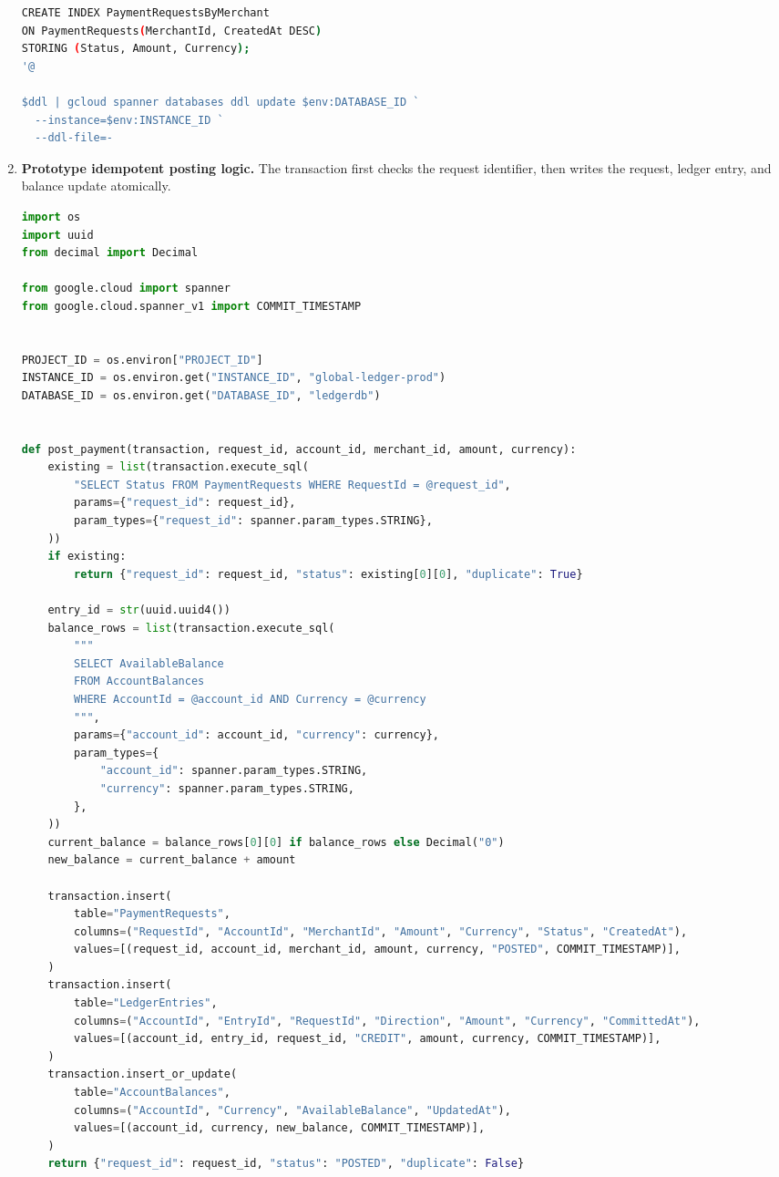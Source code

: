 \begin{enumerate}
\begin{lstlisting}[language=bash,caption={Capstone Spanner payment-ledger database and schema creation.}]
CREATE INDEX PaymentRequestsByMerchant
ON PaymentRequests(MerchantId, CreatedAt DESC)
STORING (Status, Amount, Currency);
'@

$ddl | gcloud spanner databases ddl update $env:DATABASE_ID `
  --instance=$env:INSTANCE_ID `
  --ddl-file=-
\end{lstlisting}

    \item \textbf{Prototype idempotent posting logic.} The transaction first checks the request identifier, then writes the request, ledger entry, and balance update atomically.

\begin{lstlisting}[language=Python,caption={Idempotent payment posting with a Spanner read-write transaction.}]
import os
import uuid
from decimal import Decimal

from google.cloud import spanner
from google.cloud.spanner_v1 import COMMIT_TIMESTAMP


PROJECT_ID = os.environ["PROJECT_ID"]
INSTANCE_ID = os.environ.get("INSTANCE_ID", "global-ledger-prod")
DATABASE_ID = os.environ.get("DATABASE_ID", "ledgerdb")


def post_payment(transaction, request_id, account_id, merchant_id, amount, currency):
    existing = list(transaction.execute_sql(
        "SELECT Status FROM PaymentRequests WHERE RequestId = @request_id",
        params={"request_id": request_id},
        param_types={"request_id": spanner.param_types.STRING},
    ))
    if existing:
        return {"request_id": request_id, "status": existing[0][0], "duplicate": True}

    entry_id = str(uuid.uuid4())
    balance_rows = list(transaction.execute_sql(
        """
        SELECT AvailableBalance
        FROM AccountBalances
        WHERE AccountId = @account_id AND Currency = @currency
        """,
        params={"account_id": account_id, "currency": currency},
        param_types={
            "account_id": spanner.param_types.STRING,
            "currency": spanner.param_types.STRING,
        },
    ))
    current_balance = balance_rows[0][0] if balance_rows else Decimal("0")
    new_balance = current_balance + amount

    transaction.insert(
        table="PaymentRequests",
        columns=("RequestId", "AccountId", "MerchantId", "Amount", "Currency", "Status", "CreatedAt"),
        values=[(request_id, account_id, merchant_id, amount, currency, "POSTED", COMMIT_TIMESTAMP)],
    )
    transaction.insert(
        table="LedgerEntries",
        columns=("AccountId", "EntryId", "RequestId", "Direction", "Amount", "Currency", "CommittedAt"),
        values=[(account_id, entry_id, request_id, "CREDIT", amount, currency, COMMIT_TIMESTAMP)],
    )
    transaction.insert_or_update(
        table="AccountBalances",
        columns=("AccountId", "Currency", "AvailableBalance", "UpdatedAt"),
        values=[(account_id, currency, new_balance, COMMIT_TIMESTAMP)],
    )
    return {"request_id": request_id, "status": "POSTED", "duplicate": False}



\end{lstlisting}
\end{enumerate}
